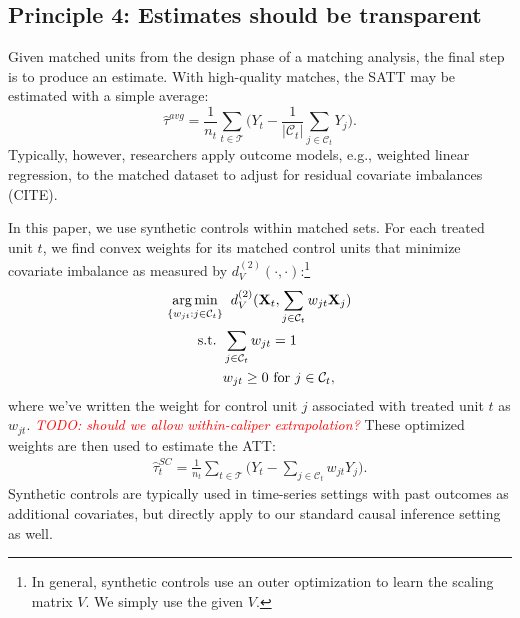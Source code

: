 \documentclass{article}
\newcommand{\Xt}{\mathbf{X}_t}
\newcommand{\Xj}{\mathbf{X}_j}
\newcommand{\Ct}{\mathcal{C}_{t}}
\DeclareMathOperator*{\argmin}{arg\,min}
\newcommand{\note}[1]{\textcolor{red}{\textit{#1}}}
\begin{document}

\subsection{Principle 4: Estimates should be transparent}

Given matched units from the design phase of a matching analysis, the final step is to produce an estimate.
With high-quality matches, the SATT may be estimated with a simple average:
$$\hat{\tau}^{avg} = \frac{1}{n_t} \sum_{t \in \mathcal{T}} \big( Y_t - \frac{1}{|\Ct|} \sum_{j \in \Ct} Y_j \big).$$
Typically, however, researchers apply outcome models, e.g., weighted linear regression, to the matched dataset to adjust for residual covariate imbalances (CITE).

In this paper, we use synthetic controls \citep{abadie2010synthetic} within matched sets.
For each treated unit $t$, we find convex weights for its matched control units that minimize covariate imbalance as measured by $d_V^{(2)}(\cdot, \cdot)$:\footnote{In general, synthetic controls use an outer optimization to learn the scaling matrix $V$.
We simply use the given $V$.}
\begin{align*}
    \argmin_{\{w_{jt} : j \in \Ct\}} 
        &\hspace{2mm} d_V^{(2)}(\Xt, \sum_{j \in \Ct}w_{jt} \Xj) \\
    \text{s.t. } 
        &\sum_{j \in \Ct} w_{jt} = 1 \\
        &w_{jt} \geq 0 \text{ for } j \in \mathcal{C}_t,
\end{align*}
where we've written the weight for control unit $j$ associated with treated unit $t$ as $w_{jt}$.
\note{TODO: should we allow within-caliper extrapolation?}
These optimized weights are then used to estimate the ATT:
\begin{align*}
    \hat{\tau}_t^{SC} = \frac{1}{n_t} \sum_{t \in \mathcal{T}} \big(Y_t - \sum_{j \in \Ct} w_{jt} Y_j \big).
\end{align*}
Synthetic controls are typically used in time-series settings with past outcomes as additional covariates, but directly apply to our standard causal inference setting as well.
\end{document}
